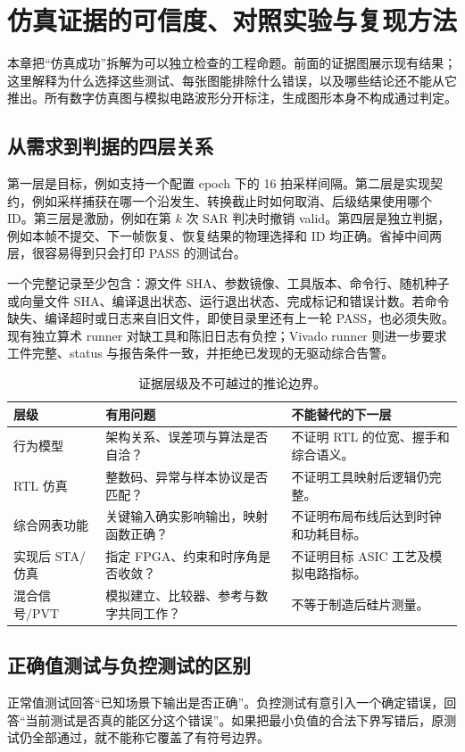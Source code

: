 \chapter{仿真证据的可信度、对照实验与复现方法}
\label{ch:evidence-method}
本章把“仿真成功”拆解为可以独立检查的工程命题。前面的证据图展示现有结果；这里解释为什么选择这些测试、每张图能排除什么错误，以及哪些结论还不能从它推出。所有数字仿真图与模拟电路波形分开标注，生成图形本身不构成通过判定。

\section{从需求到判据的四层关系}
第一层是目标，例如支持一个配置 epoch 下的 16 拍采样间隔。第二层是实现契约，例如采样捕获在哪一个沿发生、转换截止时如何取消、后级结果使用哪个 ID。第三层是激励，例如在第 \(k\) 次 SAR 判决时撤销 valid。第四层是独立判据，例如本帧不提交、下一帧恢复、恢复结果的物理选择和 ID 均正确。省掉中间两层，很容易得到只会打印 PASS 的测试台。

一个完整记录至少包含：源文件 SHA、参数镜像、工具版本、命令行、随机种子或向量文件 SHA、编译退出状态、运行退出状态、完成标记和错误计数。若命令缺失、编译超时或日志来自旧文件，即使目录里还有上一轮 PASS，也必须失败。现有独立算术 runner 对缺工具和陈旧日志有负控；Vivado runner 则进一步要求工件完整、status 与报告条件一致，并拒绝已发现的无驱动综合告警。

\begin{table}[htbp]\centering\small
\begin{tabularx}{\textwidth}{p{25mm}X X}\toprule
层级&有用问题&不能替代的下一层\\\midrule
行为模型&架构关系、误差项与算法是否自洽？&不证明 RTL 的位宽、握手和综合语义。\\
RTL 仿真&整数码、异常与样本协议是否匹配？&不证明工具映射后逻辑仍完整。\\
综合网表功能&关键输入确实影响输出，映射函数正确？&不证明布局布线后达到时钟和功耗目标。\\
实现后 STA/仿真&指定 FPGA、约束和时序角是否收敛？&不证明目标 ASIC 工艺及模拟电路指标。\\
混合信号/PVT&模拟建立、比较器、参考与数字共同工作？&不等于制造后硅片测量。\\
\bottomrule\end{tabularx}
\caption{证据层级及不可越过的推论边界。}
\end{table}

\section{正确值测试与负控测试的区别}
正常值测试回答“已知场景下输出是否正确”。负控测试有意引入一个确定错误，回答“当前测试是否真的能区分这个错误”。如果把最小负值的合法下界写错后，原测试仍全部通过，就不能称它覆盖了有符号边界。

